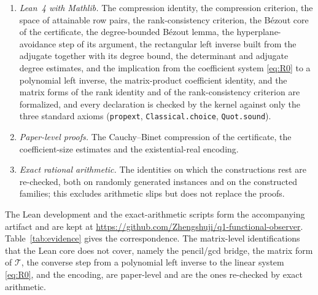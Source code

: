 \documentclass[journal]{IEEEtran}
\theoremstyle{plainn}
\theoremstyle{remark}
\begin{document}
\begin{enumerate}
\item \emph{Lean~4 with Mathlib.} The compression identity, the compression criterion, the space of attainable row pairs, the rank-consistency criterion, the B\'ezout core of the certificate, the degree-bounded B\'ezout lemma, the hyperplane-avoidance step of its argument, the rectangular left inverse built from the adjugate together with its degree bound, the determinant and adjugate degree estimates, and the implication from the coefficient system \eqref{eq:R0} to a polynomial left inverse, the matrix-product coefficient identity, and the matrix forms of the rank identity and of the rank-consistency criterion are formalized, and every declaration is checked by the kernel against only the three standard axioms (\texttt{propext}, \texttt{Classical.choice}, \texttt{Quot.sound}).
\item \emph{Paper-level proofs.} The Cauchy--Binet compression of the certificate, the coefficient-size estimates and the existential-real encoding.
\item \emph{Exact rational arithmetic.} The identities on which the constructions rest are re-checked, both on randomly generated instances and on the constructed families; this excludes arithmetic slips but does not replace the proofs.
\end{enumerate}

The Lean development and the exact-arithmetic scripts form the accompanying artifact and are kept at \url{https://github.com/Zhengshuji/q1-functional-observer}. Table~\ref{tab:evidence} gives the correspondence. The matrix-level identifications that the Lean core does not cover, namely the pencil/gcd bridge, the matrix form of $\mathcal T$, the converse step from a polynomial left inverse to the linear system \eqref{eq:R0}, and the encoding, are paper-level and are the ones re-checked by exact arithmetic.
\end{document}
